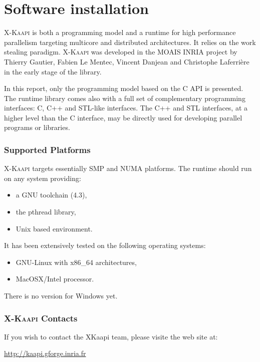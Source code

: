 \documentclass[a4paper, 11pt]{article}
\newcommand{\kaapi}{\textsc{X-Kaapi}\xspace}
\begin{document}
\makeRT %

\tableofcontents
{}

\newpage
\section{Software installation}\label{sec:userinstall}

\kaapi is both a programming model and a runtime for high performance parallelism targeting multicore and distributed architectures. 
It relies on the work stealing paradigm.
\kaapi was developed in the MOAIS INRIA project by Thierry Gautier, Fabien Le Mentec, Vincent Danjean and Christophe Laferrière in the early stage of the library.

In this report, only the programming model based on the C API is presented.
The runtime library comes also with a full set of complementary programming interfaces: C, C++ and STL-like interfaces. The C++ and STL interfaces, at a higher level than the C interface, may be directly used for developing parallel programs or libraries.

\subsubsection*{Supported Platforms}
\kaapi targets essentially SMP and NUMA platforms. The runtime should run
on any system providing:
\begin{itemize}
\item a GNU toolchain (4.3),
\item the pthread library,
\item Unix based environment.
\end{itemize}
It has been extensively tested on the following operating systems:
\begin{itemize}
\item GNU-Linux with x86\_64 architectures,
\item MacOSX/Intel processor.
\end{itemize}

There is no version for Windows yet.

\subsubsection*{\kaapi Contacts}
If you wish to contact the XKaapi team, please visite the web site at:
\begin{center}
\url{http://kaapi.gforge.inria.fr}
\end{center}
\end{document}
